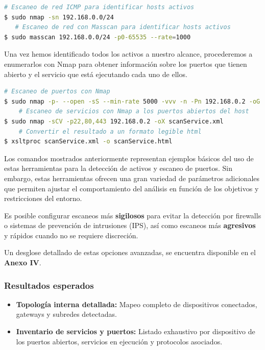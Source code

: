 \documentclass[a4paper, 11pt]{article}
\begin{document}
\par\vspace{0.5cm}

\begin{lstlisting}[language=bash, style=terminalstyle, caption=Escaneo de activos en la red]
    # Escaneo de red ICMP para identificar hosts activos
$ sudo nmap -sn 192.168.0.0/24
   # Escaneo de red con Masscan para identificar hosts activos 
$ sudo masscan 192.168.0.0/24 -p0-65535 --rate=1000
\end{lstlisting}


Una vez hemos identificado todos los activos a nuestro alcance, procederemos a enumerarlos con Nmap para obtener información sobre los puertos que tienen abierto y el servicio que está ejecutando cada uno de ellos.

\begin{lstlisting}[language=bash, style=terminalstyle, caption=Escaneo de puertos y servicios con Nmap]
    # Escaneo de puertos con Nmap
$ sudo nmap -p- --open -sS --min-rate 5000 -vvv -n -Pn 192.168.0.2 -oG allPorts
    # Escaneo de servicios con Nmap a los puertos abiertos del host
$ sudo nmap -sCV -p22,80,443 192.168.0.2 -oX scanService.xml
    # Convertir el resultado a un formato legible html
$ xsltproc scanService.xml -o scanService.html
\end{lstlisting}



Los comandos mostrados anteriormente representan ejemplos básicos del uso de estas herramientas para la detección de activos y escaneo de puertos. Sin embargo, estas herramientas ofrecen una gran variedad de parámetros adicionales que permiten ajustar el comportamiento del análisis en función de los objetivos y restricciones del entorno.
\par\vspace{0.5cm}
Es posible configurar escaneos más \textbf{sigilosos} para evitar la detección por firewalls o sistemas de prevención de intrusiones (IPS), así como escaneos más \textbf{agresivos} y rápidos cuando no se requiere discreción.
\par\vspace{0.5cm}
Un desglose detallado de estas opciones avanzadas, se encuentra disponible en el \textbf{Anexo IV}.

\subsubsection*{Resultados esperados}
\begin{itemize}

    \item \textbf{Topología interna detallada:} Mapeo completo de dispositivos conectados, gateways y subredes detectadas. 
    
    \item \textbf{Inventario de servicios y puertos:} Listado exhaustivo por dispositivo de los puertos abiertos, servicios en ejecución y protocolos asociados.
\end{itemize}
\end{document}
